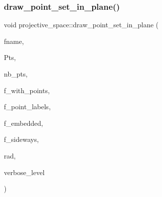 \mbox{\label{classprojective__space_af7dec07dbcf71124f145629e719454f0}} 
\subsubsection{\texorpdfstring{draw\+\_\+point\+\_\+set\+\_\+in\+\_\+plane()}{draw\_point\_set\_in\_plane()}}
{\footnotesize\ttfamily void projective\+\_\+space\+::draw\+\_\+point\+\_\+set\+\_\+in\+\_\+plane (\begin{DoxyParamCaption}\item[{const char $\ast$}]{fname,  }\item[{\mbox{\hyperlink{galois_8h_a09fddde158a3a20bd2dcadb609de11dc}{I\+NT}} $\ast$}]{Pts,  }\item[{\mbox{\hyperlink{galois_8h_a09fddde158a3a20bd2dcadb609de11dc}{I\+NT}}}]{nb\+\_\+pts,  }\item[{\mbox{\hyperlink{galois_8h_a09fddde158a3a20bd2dcadb609de11dc}{I\+NT}}}]{f\+\_\+with\+\_\+points,  }\item[{\mbox{\hyperlink{galois_8h_a09fddde158a3a20bd2dcadb609de11dc}{I\+NT}}}]{f\+\_\+point\+\_\+labels,  }\item[{\mbox{\hyperlink{galois_8h_a09fddde158a3a20bd2dcadb609de11dc}{I\+NT}}}]{f\+\_\+embedded,  }\item[{\mbox{\hyperlink{galois_8h_a09fddde158a3a20bd2dcadb609de11dc}{I\+NT}}}]{f\+\_\+sideways,  }\item[{\mbox{\hyperlink{galois_8h_a09fddde158a3a20bd2dcadb609de11dc}{I\+NT}}}]{rad,  }\item[{\mbox{\hyperlink{galois_8h_a09fddde158a3a20bd2dcadb609de11dc}{I\+NT}}}]{verbose\+\_\+level }\end{DoxyParamCaption})}

\mbox{\label{classprojective__space_aec560e1265b1b700f47c369c4df07c7c}} 

